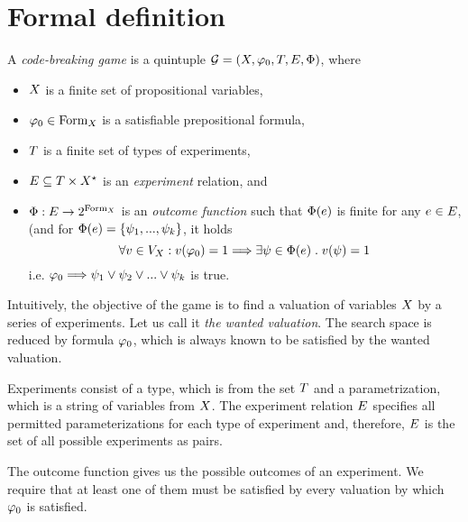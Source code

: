 \section{Formal definition}
\begin{definition} \label{def-game}
A \emph{code-breaking game} is a quintuple
  $\mathcal{G} = (X, \varphi_0, T, E, \Phi)$, where
  \begin{itemize}
  \item $X$ is a finite set of propositional variables,
  \item $\varphi_0 \in \textrm{Form}_X$ is a satisfiable prepositional formula,
  \item $T$ is a finite set of types of experiments,
  \item $E \subseteq T \times X^\star$ is an \emph{experiment} relation,
  and
  \item $\Phi: E -> 2^{\textrm{Form}_X}$ is an
  \emph{outcome function} such that $\Phi(e)$ is finite
  for any $e\in E$, (and for $\Phi(e) = \{\psi_1, ..., \psi_k\}$,
  it holds
  \[
  \forall v\in V_X:  v(\varphi_0) = 1 ==> \exists\psi\in\Phi(e)\;.\; v(\psi) = 1
  \]
  i.e. $\varphi_0 ==> \psi_1 \vee \psi_2 \vee ... \vee \psi_k$ is true.

 \end{itemize}
\end{definition}

Intuitively, the objective of the game is to find a valuation of
  variables $X$ by a series of experiments.
Let us call it \emph{the wanted valuation}.
The search space is reduced by formula $\varphi_0$,
  which is always known to be satisfied by the wanted valuation.

Experiments consist of a type, which is from the set $T$ and a
  parametrization, which is a string of variables from $X$.
The experiment relation $E$ specifies all permitted parameterizations
  for each type of experiment and, therefore, $E$ is the set of
  all possible experiments as pairs.

The outcome function gives us the possible outcomes of an experiment.
  We require that at least one of them must be satisfied by every valuation
  by which $\varphi_0$ is satisfied.




